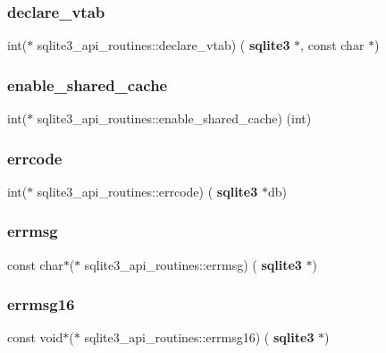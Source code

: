 \subsubsection{declare\_vtab}
{\footnotesize\ttfamily int($\ast$ sqlite3\+\_\+api\+\_\+routines\+::declare\+\_\+vtab) (\textbf{ sqlite3} $\ast$, const char $\ast$)}

\mbox{\label{structsqlite3__api__routines_ae67da9e0a3629fd1fd46fd73389d8c98}} 
\subsubsection{enable\_shared\_cache}
{\footnotesize\ttfamily int($\ast$ sqlite3\+\_\+api\+\_\+routines\+::enable\+\_\+shared\+\_\+cache) (int)}

\mbox{\label{structsqlite3__api__routines_a1a985d959eafe6f293e41a5ca1d1a2e9}} 
\subsubsection{errcode}
{\footnotesize\ttfamily int($\ast$ sqlite3\+\_\+api\+\_\+routines\+::errcode) (\textbf{ sqlite3} $\ast$db)}

\mbox{\label{structsqlite3__api__routines_a69002673143895d276850a400e7955d7}} 
\subsubsection{errmsg}
{\footnotesize\ttfamily const char$\ast$($\ast$ sqlite3\+\_\+api\+\_\+routines\+::errmsg) (\textbf{ sqlite3} $\ast$)}

\mbox{\label{structsqlite3__api__routines_a1392e153c69f5b32fd8acc19cb780baf}} 
\subsubsection{errmsg16}
{\footnotesize\ttfamily const void$\ast$($\ast$ sqlite3\+\_\+api\+\_\+routines\+::errmsg16) (\textbf{ sqlite3} $\ast$)}

